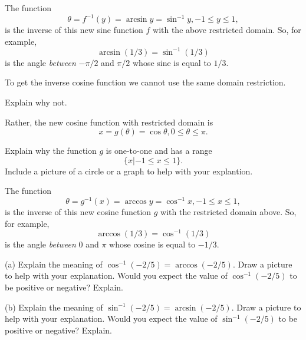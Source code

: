 \documentclass{ximera}
\begin{document}
The function
\[
   \theta = f^{-1}(y) = \arcsin y = \sin^{-1} y , -1\leq y \leq 1 ,
\]
is the inverse of this new sine function $f$ with the above restricted domain. So, for example, 
\[
    \arcsin (1/3) = \sin^{-1}(1/3)
\]
is the angle \emph{between} $-\pi/2$ and $\pi/2$ whose sine is equal to $1/3$.

To get the inverse cosine function we cannot use the same domain restriction.

\begin{question}  \label{Q2:Inverse}
Explain why not.
\end{question}

Rather, the new cosine function with restricted domain is
\[
    x  = g(\theta) = \cos \theta , 0 \leq \theta \leq \pi . 
\]

\begin{question}  \label{Q3:Inverse}
Explain why the function $g$ is one-to-one and has a range 
\[
   \{x | -1 \leq x \leq 1\}. 
\]
Include a picture of a circle or a graph to help with your explantion.
\end{question}

The function
\[
   \theta = g^{-1}(x) = \arccos y = \cos^{-1} x , -1\leq x \leq 1 ,
\]
is the inverse of this new cosine function $g$ with the restricted domain above. So, for example, 
\[
    \arccos(1/3) = \cos^{-1}(1/3)
\]
is the angle \emph{between} $0$ and $\pi$ whose cosine is equal to $-1/3$.


\begin{question} \label{Q5:Inverse}
(a) Explain the meaning of $\cos^{-1}(-2/5) = \arccos(-2/5)$. Draw a picture to help with your explanation. Would you expect the value of $\cos^{-1}(-2/5)$ to be positive or negative? Explain.

(b)  Explain the meaning of $\sin^{-1}(-2/5) = \arcsin(-2/5)$. Draw a picture to help with your explanation. Would you expect the value of $\sin^{-1}(-2/5)$ to be positive or negative? Explain.

\end{question}
\end{document}
